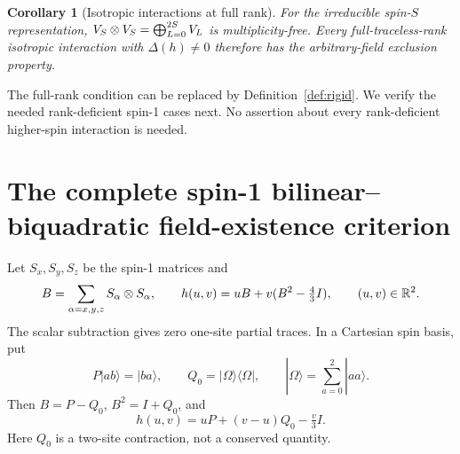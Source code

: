 \documentclass[11pt,a4paper]{article}
\numberwithin{equation}{section}
\newtheorem{corollary}[theorem]{Corollary}
\theoremstyle{definition}\newtheorem{definition}[theorem]{Definition}
\theoremstyle{remark}\newtheorem{remark}[theorem]{Remark}
\begin{document}
\begin{corollary}[Isotropic interactions at full rank]\label{cor:spinS}
For the irreducible spin-$S$ representation, $V_S\otimes V_S=\bigoplus_{L=0}^{2S}V_L$ is multiplicity-free. Every full-traceless-rank isotropic interaction with $\Delta(h)\ne0$ therefore has the arbitrary-field exclusion property.
\end{corollary}

The full-rank condition can be replaced by Definition~\ref{def:rigid}. We verify the needed rank-deficient spin-1 cases next. No assertion about every rank-deficient higher-spin interaction is needed.

\section{The complete spin-1 bilinear--biquadratic field-existence criterion}\label{sec:blbq}

Let $S_x,S_y,S_z$ be the spin-1 matrices and
\begin{equation}\label{eq:blbq}
 B=\sum_{\alpha=x,y,z}S_\alpha\otimes S_\alpha,
 \qquad h(u,v)=uB+v(B^2-\tfrac43I),\qquad (u,v)\in\mathbb R^2.
\end{equation}
The scalar subtraction gives zero one-site partial traces. In a Cartesian spin basis, put
\[
 P|ab\rangle=|ba\rangle,\qquad
 Q_0=|\Omega\rangle\langle\Omega|,\qquad |\Omega\rangle=\sum_{a=0}^2|aa\rangle.
\]
Then $B=P-Q_0$, $B^2=I+Q_0$, and
\begin{equation}\label{eq:cartesian}
 h(u,v)=uP+(v-u)Q_0-\tfrac v3I.
\end{equation}
Here $Q_0$ is a two-site contraction, not a conserved quantity.
\end{document}

